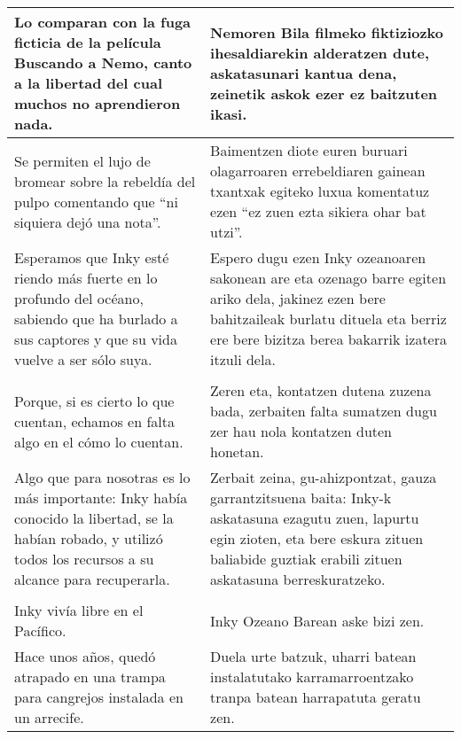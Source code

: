 \documentclass{article}
\begin{document}
\begin{center}
\begin{longtable}{|p{6cm}|p{6cm}|}
  \midrule
  Lo comparan con la fuga ficticia de la película Buscando a Nemo, canto a la libertad del cual muchos no aprendieron nada.&
  Nemoren Bila filmeko fiktiziozko ihesaldiarekin alderatzen dute, askatasunari kantua dena, zeinetik askok ezer ez baitzuten ikasi.\\

  \midrule
  Se permiten el lujo de bromear sobre la rebeldía del pulpo comentando que ``ni siquiera dejó una nota''.&
  Baimentzen diote euren buruari olagarroaren errebeldiaren gainean txantxak egiteko luxua komentatuz ezen ``ez zuen ezta sikiera ohar bat utzi''.\\

  \midrule
  Esperamos que Inky esté riendo más fuerte en lo profundo del océano, sabiendo que ha burlado a sus captores y que su vida vuelve a ser sólo suya.&
  Espero dugu ezen Inky ozeanoaren sakonean are eta ozenago barre egiten ariko dela, jakinez ezen bere bahitzaileak burlatu dituela eta berriz ere bere bizitza berea bakarrik izatera itzuli dela.\\

  \midrule
  \cellcolor{lightgray}{\textbf{Párrafo}} &
  \cellcolor{lightgray}{\textbf{Paragrafoa}}\\
  
  \midrule
  Porque, si es cierto lo que cuentan, echamos en falta algo en el cómo lo cuentan.&
  Zeren eta, kontatzen dutena zuzena bada, zerbaiten falta sumatzen dugu zer hau nola kontatzen duten honetan.\\

  \midrule
  Algo que para nosotras es lo más importante: Inky había conocido la libertad, se la habían robado, y utilizó todos los recursos a su alcance para recuperarla.&
  Zerbait zeina, gu-ahizpontzat, gauza garrantzitsuena baita: Inky-k askatasuna ezagutu zuen, lapurtu egin zioten, eta bere eskura zituen baliabide guztiak erabili zituen askatasuna berreskuratzeko.\\

  \midrule
  \cellcolor{lightgray}{\textbf{Párrafo}} &
  \cellcolor{lightgray}{\textbf{Paragrafoa}}\\
  
  \midrule
  Inky vivía libre en el Pacífico.&
  Inky Ozeano Barean aske bizi zen.\\

  \midrule
  Hace unos años, quedó atrapado en una trampa para cangrejos instalada en un arrecife.&
  Duela urte batzuk, uharri batean instalatutako karramarroentzako tranpa batean harrapatuta geratu zen.\\


\end{longtable}
\end{center}
\end{document}
